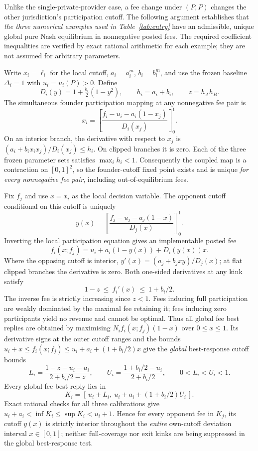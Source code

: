 Unlike the single-private-provider case, a fee change under $(P,P)$ changes the other jurisdiction's participation cutoff. The following argument establishes that \emph{the three numerical examples used in Table~\ref{tab:entry}} have an admissible, unique global pure Nash equilibrium in nonnegative posted fees. The required coefficient inequalities are verified by exact rational arithmetic for each example; they are not assumed for arbitrary parameters.

Write $x_i=\ell_i$ for the local cutoff, $a_i=a_i^m$, $b_i=b_i^m$, and use the frozen baseline $\Delta_i=1$ with $u_i=u_i(P)>0$. Define
\[
 D_i(y)=1+\tfrac{b_i}{2}(1-y^2),\qquad
 h_i=a_i+b_i,\qquad z=h_Ah_B.
\]
The simultaneous founder participation mapping at any nonnegative fee pair is
\begin{equation}
 x_i=\left[\frac{f_i-u_i-a_i(1-x_j)}{D_i(x_j)}\right]_0^1 .
 \label{eq:pp-clipped-cert}
\end{equation}
On an interior branch, the derivative with respect to $x_j$ is $(a_i+b_i x_i x_j)/D_i(x_j)\leq h_i$.
On clipped branches it is zero. Each of the three frozen parameter sets satisfies $\max_i h_i<1$. Consequently the coupled map is a contraction on $[0,1]^2$, so the founder-cutoff fixed point exists and is unique \emph{for every nonnegative fee pair}, including out-of-equilibrium fees.

Fix $f_j$ and use $x=x_i$ as the local decision variable. The opponent cutoff conditional on this cutoff is uniquely
\[
 y(x)=\left[\frac{f_j-u_j-a_j(1-x)}{D_j(x)}\right]_0^1 .
\]
Inverting the local participation equation gives an implementable posted fee
\[
 f_i(x;f_j)=u_i+a_i(1-y(x))+D_i(y(x))x .
\]
Where the opposing cutoff is interior, $y'(x)=(a_j+b_jxy)/D_j(x)$; at flat clipped branches the derivative is zero. Both one-sided derivatives at any kink satisfy
\begin{equation}
 1-z\ \leq\ f_i'(x)\ \leq\ 1+b_i/2 .\label{eq:pp-monotone-inverse}
\end{equation}
The inverse fee is strictly increasing since $z<1$. Fees inducing full participation are weakly dominated by the maximal fee retaining it; fees inducing zero participants yield no revenue and cannot be optimal. Thus all global fee best replies are obtained by maximising $N_i f_i(x;f_j)(1-x)$ over $0\leq x\leq1$. Its derivative signs at the outer cutoff ranges and the bounds
$u_i+x\leq f_i(x;f_j)\leq u_i+a_i+(1+b_i/2)x$
give the \emph{global} best-response cutoff bounds
\begin{equation}
 L_i=\frac{1-z-u_i-a_i}{2+b_i/2-z},\qquad
 U_i=\frac{1+b_i/2-u_i}{2+b_i/2},\qquad
 0<L_i<U_i<1 .
 \label{eq:pp-cutoff-box}
\end{equation}
Every global fee best reply lies in
\[
 K_i=[\,u_i+L_i,\ u_i+a_i+(1+b_i/2)U_i\,].
\]
Exact rational checks for all three calibrations give
$u_i+a_i<\inf K_i\leq\sup K_i<u_i+1$.
Hence for every opponent fee in $K_j$, its cutoff $y(x)$ is strictly interior throughout the \emph{entire} own-cutoff deviation interval $x\in[0,1]$; neither full-coverage nor exit kinks are being suppressed in the global best-response test.

